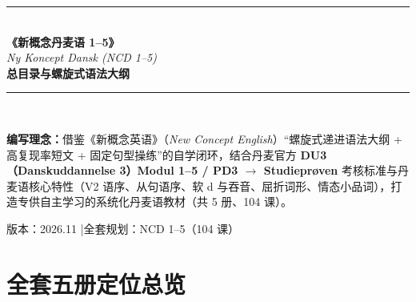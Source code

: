 \documentclass[10.5pt, a4paper]{ctexart}
\begin{document}
\begin{titlepage}
  \centering
  \vspace*{2.5cm}
  {\color{NCDRed}\rule{\linewidth}{2pt}}\\[1.2cm]
  {\Huge\bfseries\color{NCDNavy} 《新概念丹麦语 1--5》}\\[0.5cm]
  {\LARGE\itshape\color{NCDTeal} Ny Koncept Dansk (NCD 1--5)}\\[0.6cm]
  {\Large\bfseries\color{NCDGray} 总目录与螺旋式语法大纲}\\[1.2cm]
  {\color{NCDRed}\rule{\linewidth}{2pt}}\\[2cm]

  \begin{tcolorbox}[
    colback=NCDBgBlue,
    colframe=NCDNavy,
    width=0.88\linewidth,
    arc=4pt,
    boxrule=0.8pt,
    left=14pt, right=14pt, top=12pt, bottom=12pt
  ]
    \textbf{\color{NCDNavy}编写理念：}借鉴《新概念英语》（\textit{New Concept English}）“螺旋式递进语法大纲 + 高复现率短文 + 固定句型操练”的自学闭环，结合丹麦官方 \textbf{DU3（Danskuddannelse 3）Modul 1--5 / PD3 $\rightarrow$ Studieprøven} 考核标准与丹麦语核心特性（V2 语序、从句语序、软 d 与吞音、屈折词形、情态小品词），打造专供自主学习的系统化丹麦语教材（共 5 册、104 课）。
  \end{tcolorbox}

  \vfill
  {\large\color{NCDGray} 版本：2026.11 \quad|\quad 全套规划：NCD 1--5（104 课）}
\end{titlepage}

\tableofcontents
\clearpage

\section{全套五册定位总览}
\end{document}
